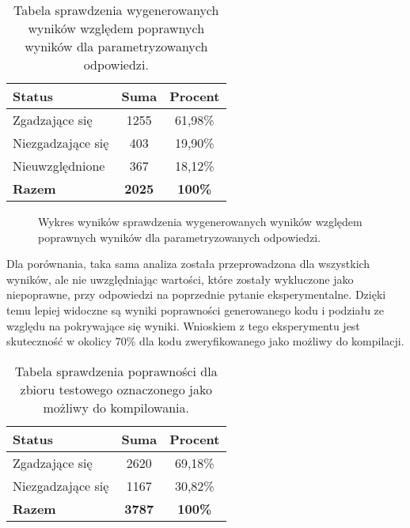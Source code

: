 \begin{table}[ht]
\caption{Tabela sprawdzenia wygenerowanych wyników względem poprawnych wyników dla parametryzowanych odpowiedzi.}\label{tab:tabela6}
\centering%
\begin{tabular}{|l|c|c|}
\hline
\textbf{Status} & \textbf{Suma} & \textbf{Procent} \\
\hline
Zgadzające się & 1255 & 61,98\% \\
\hline
Niezgadzające się & 403 & 19,90\% \\
\hline
Nieuwzględnione & 367 & 18,12\% \\
\hline
\textbf{Razem} & \textbf{2025} & \textbf{100\%} \\
\hline
\end{tabular}
\end{table}

\begin{figure}[H]
\centering
{}
\caption{Wykres wyników sprawdzenia wygenerowanych wyników względem poprawnych wyników dla parametryzowanych odpowiedzi.}\label{rys:plama2f}
\end{figure}

Dla porównania, taka sama analiza została przeprowadzona dla wszystkich wyników, ale nie uwzględniając wartości, które zostały wykluczone jako niepoprawne, przy odpowiedzi na poprzednie pytanie eksperymentalne. Dzięki temu lepiej widoczne są wyniki poprawności generowanego kodu i podziału ze względu na pokrywające się wyniki. Wnioskiem z tego eksperymentu jest skuteczność w okolicy 70\% dla kodu zweryfikowanego jako możliwy do kompilacji.

\begin{table}[ht]
\caption{Tabela sprawdzenia poprawności dla zbioru testowego oznaczonego jako możliwy do kompilowania.}\label{tab:tabela7}
\centering%
\begin{tabular}{|l|c|c|}
\hline
\textbf{Status} & \textbf{Suma} & \textbf{Procent} \\
\hline
Zgadzające się & 2620 & 69,18\% \\
\hline
Niezgadzające się & 1167 & 30,82\% \\
\hline
\textbf{Razem} & \textbf{3787} & \textbf{100\%} \\
\hline
\end{tabular}
\end{table}

